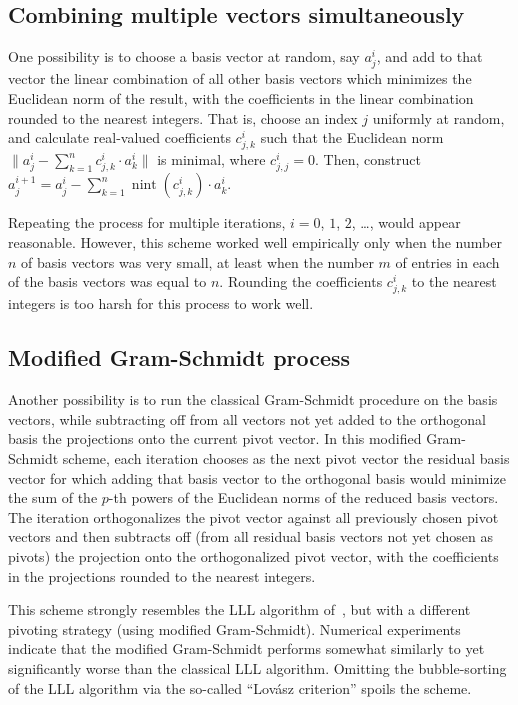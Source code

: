 \documentclass{article}
\DeclareMathOperator{\nint}{nint}
\begin{document}
\subsection{Combining multiple vectors simultaneously}
\label{multiple}

One possibility is to choose a basis vector at random, say $a^i_j$,
and add to that vector the linear combination of all other basis vectors
which minimizes the Euclidean norm of the result, with the coefficients
in the linear combination rounded to the nearest integers.
That is, choose an index $j$ uniformly at random,
and calculate real-valued coefficients $c^i_{j,k}$ such that the Euclidean norm
$\| a^i_j - \sum_{k=1}^n c^i_{j,k} \cdot a^i_k \|$ is minimal,
where $c^i_{j,j} = 0$. Then, construct
$a^{i+1}_j = a^i_j - \sum_{k=1}^n \nint(c^i_{j,k}) \cdot a^i_k$.

Repeating the process for multiple iterations, $i = 0$, $1$, $2$, \dots,
would appear reasonable. However, this scheme worked well empirically only
when the number $n$ of basis vectors was very small, at least
when the number $m$ of entries in each of the basis vectors was equal to $n$.
Rounding the coefficients $c^i_{j,k}$ to the nearest integers is too harsh
for this process to work well.

\subsection{Modified Gram-Schmidt process}
\label{modified}

Another possibility is to run the classical Gram-Schmidt procedure
on the basis vectors, while subtracting off from all vectors
not yet added to the orthogonal basis the projections
onto the current pivot vector. In this modified Gram-Schmidt scheme,
each iteration chooses as the next pivot vector the residual basis vector
for which adding that basis vector to the orthogonal basis would
minimize the sum of the $p$-th powers of the Euclidean norms
of the reduced basis vectors. The iteration orthogonalizes the pivot vector
against all previously chosen pivot vectors and then subtracts off
(from all residual basis vectors not yet chosen as pivots)
the projection onto the orthogonalized pivot vector,
with the coefficients in the projections rounded to the nearest integers.

This scheme strongly resembles the LLL algorithm
of~\cite{lenstra-lenstra-lovasz}, but with a different pivoting strategy
(using modified Gram-Schmidt). Numerical experiments indicate that
the modified Gram-Schmidt performs somewhat similarly to
yet significantly worse than the classical LLL algorithm.
Omitting the bubble-sorting of the LLL algorithm
via the so-called ``Lov\'asz criterion'' spoils the scheme.
\end{document}
